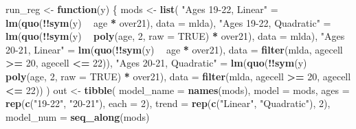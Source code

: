 \documentclass[]{book}
\newenvironment{Shaded}{\begin{snugshade}}{\end{snugshade}}
\newcommand{\ControlFlowTok}[1]{\textcolor[rgb]{0.13,0.29,0.53}{\textbf{#1}}}
\newcommand{\DataTypeTok}[1]{\textcolor[rgb]{0.13,0.29,0.53}{#1}}
\newcommand{\DecValTok}[1]{\textcolor[rgb]{0.00,0.00,0.81}{#1}}
\newcommand{\KeywordTok}[1]{\textcolor[rgb]{0.13,0.29,0.53}{\textbf{#1}}}
\newcommand{\NormalTok}[1]{#1}
\newcommand{\OperatorTok}[1]{\textcolor[rgb]{0.81,0.36,0.00}{\textbf{#1}}}
\newcommand{\OtherTok}[1]{\textcolor[rgb]{0.56,0.35,0.01}{#1}}
\newcommand{\StringTok}[1]{\textcolor[rgb]{0.31,0.60,0.02}{#1}}
\theoremstyle{definition}
\theoremstyle{definition}
\theoremstyle{definition}
\theoremstyle{remark}
\begin{document}
\begin{Shaded}
\begin{Highlighting}[]
\NormalTok{run_reg <-}\StringTok{ }\ControlFlowTok{function}\NormalTok{(y) \{}
\NormalTok{  mods <-}\StringTok{ }\KeywordTok{list}\NormalTok{(}
    \StringTok{"Ages 19-22, Linear"}\NormalTok{ =}
\StringTok{      }\KeywordTok{lm}\NormalTok{(}\KeywordTok{quo}\NormalTok{(}\OperatorTok{!!}\KeywordTok{sym}\NormalTok{(y) }\OperatorTok{~}\StringTok{ }\NormalTok{age }\OperatorTok{*}\StringTok{ }\NormalTok{over21), }\DataTypeTok{data =}\NormalTok{ mlda),}
    \StringTok{"Ages 19-22, Quadratic"}\NormalTok{ =}
\StringTok{      }\KeywordTok{lm}\NormalTok{(}\KeywordTok{quo}\NormalTok{(}\OperatorTok{!!}\KeywordTok{sym}\NormalTok{(y) }\OperatorTok{~}\StringTok{ }\KeywordTok{poly}\NormalTok{(age, }\DecValTok{2}\NormalTok{, }\DataTypeTok{raw =} \OtherTok{TRUE}\NormalTok{) }\OperatorTok{*}\StringTok{ }\NormalTok{over21), }\DataTypeTok{data =}\NormalTok{ mlda),}
    \StringTok{"Ages 20-21, Linear"}\NormalTok{ =}
\StringTok{      }\KeywordTok{lm}\NormalTok{(}\KeywordTok{quo}\NormalTok{(}\OperatorTok{!!}\KeywordTok{sym}\NormalTok{(y) }\OperatorTok{~}\StringTok{ }\NormalTok{age }\OperatorTok{*}\StringTok{ }\NormalTok{over21),}
             \DataTypeTok{data =} \KeywordTok{filter}\NormalTok{(mlda, agecell }\OperatorTok{>=}\StringTok{ }\DecValTok{20}\NormalTok{, agecell }\OperatorTok{<=}\StringTok{ }\DecValTok{22}\NormalTok{)),}
    \StringTok{"Ages 20-21, Quadratic"}\NormalTok{ =}
\StringTok{      }\KeywordTok{lm}\NormalTok{(}\KeywordTok{quo}\NormalTok{(}\OperatorTok{!!}\KeywordTok{sym}\NormalTok{(y) }\OperatorTok{~}\StringTok{ }\KeywordTok{poly}\NormalTok{(age, }\DecValTok{2}\NormalTok{, }\DataTypeTok{raw =} \OtherTok{TRUE}\NormalTok{) }\OperatorTok{*}\StringTok{ }\NormalTok{over21),}
             \DataTypeTok{data =} \KeywordTok{filter}\NormalTok{(mlda, agecell }\OperatorTok{>=}\StringTok{ }\DecValTok{20}\NormalTok{, agecell }\OperatorTok{<=}\StringTok{ }\DecValTok{22}\NormalTok{))}
\NormalTok{  )}
\NormalTok{  out <-}\StringTok{ }\KeywordTok{tibble}\NormalTok{(}
    \DataTypeTok{model_name =} \KeywordTok{names}\NormalTok{(mods),}
    \DataTypeTok{model =}\NormalTok{ mods,}
    \DataTypeTok{ages =} \KeywordTok{rep}\NormalTok{(}\KeywordTok{c}\NormalTok{(}\StringTok{"19-22"}\NormalTok{, }\StringTok{"20-21"}\NormalTok{), }\DataTypeTok{each =} \DecValTok{2}\NormalTok{),}
    \DataTypeTok{trend =} \KeywordTok{rep}\NormalTok{(}\KeywordTok{c}\NormalTok{(}\StringTok{"Linear"}\NormalTok{, }\StringTok{"Quadratic"}\NormalTok{), }\DecValTok{2}\NormalTok{),}
    \DataTypeTok{model_num =} \KeywordTok{seq_along}\NormalTok{(mods)}

\end{Highlighting}
\end{Shaded}
\end{document}
